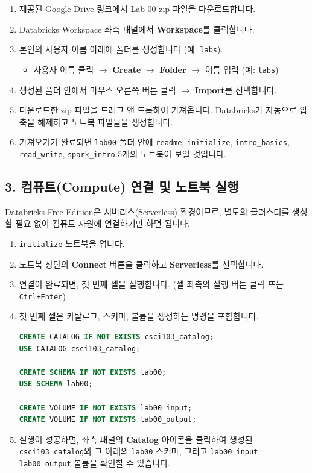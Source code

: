 \documentclass[11pt,a4paper]{article}
\theoremstyle{definition}
\begin{document}
\begin{enumerate}
    \item 제공된 Google Drive 링크에서 Lab 00 zip 파일을 다운로드합니다.
    \item Databricks Workspace 좌측 패널에서 \textbf{Workspace}를 클릭합니다.
    \item 본인의 사용자 이름 아래에 폴더를 생성합니다 (예: \texttt{labs}).
        \begin{itemize}
            \item 사용자 이름 클릭 $\rightarrow$ \textbf{Create} $\rightarrow$ \textbf{Folder} $\rightarrow$ 이름 입력 (예: \texttt{labs})
        \end{itemize}
    \item 생성된 폴더 안에서 마우스 오른쪽 버튼 클릭 $\rightarrow$ \textbf{Import}를 선택합니다.
    \item 다운로드한 zip 파일을 드래그 앤 드롭하여 가져옵니다. Databricks가 자동으로 압축을 해제하고 노트북 파일들을 생성합니다.
    \item 가져오기가 완료되면 \texttt{lab00} 폴더 안에 \texttt{readme}, \texttt{initialize}, \texttt{intro\_basics}, \texttt{read\_write}, \texttt{spark\_intro} 5개의 노트북이 보일 것입니다.
\end{enumerate}

\subsection*{3. 컴퓨트(Compute) 연결 및 노트북 실행}

Databricks Free Edition은 서버리스(Serverless) 환경이므로, 별도의 클러스터를 생성할 필요 없이 컴퓨트 자원에 연결하기만 하면 됩니다.

\begin{enumerate}
    \item \texttt{initialize} 노트북을 엽니다.
    \item 노트북 상단의 \textbf{Connect} 버튼을 클릭하고 \textbf{Serverless}를 선택합니다.
    \item 연결이 완료되면, 첫 번째 셀을 실행합니다. (셀 좌측의 실행 버튼 클릭 또는 \texttt{Ctrl+Enter})
    \item 첫 번째 셀은 카탈로그, 스키마, 볼륨을 생성하는 명령을 포함합니다.
        \begin{lstlisting}[language=sql, caption={initialize 노트북의 첫 번째 셀 예시}, label={lst:initialize_cell1}]
CREATE CATALOG IF NOT EXISTS csci103_catalog;
USE CATALOG csci103_catalog;

CREATE SCHEMA IF NOT EXISTS lab00;
USE SCHEMA lab00;

CREATE VOLUME IF NOT EXISTS lab00_input;
CREATE VOLUME IF NOT EXISTS lab00_output;
        \end{lstlisting}
    \item 실행이 성공하면, 좌측 패널의 \textbf{Catalog} 아이콘을 클릭하여 생성된 \texttt{csci103\_catalog}와 그 아래의 \texttt{lab00} 스키마, 그리고 \texttt{lab00\_input}, \texttt{lab00\_output} 볼륨을 확인할 수 있습니다.
\end{enumerate}
\end{document}
